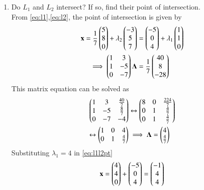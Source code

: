 \documentclass[journal,12pt,twocolumn]{IEEEtran}
\renewcommand\thesection{\arabic{section}}
\begin{document}
\begin{enumerate}[label=\thesection.\arabic*
,ref=\thesection.\theenumi]
\begin{align}
\label{eq:l2}
\end{align}
\item Do $L_1$ and $L_2$ intersect? If so, find their point of intersection.
\\
\solution From \eqref{eq:l1},\eqref{eq:l2}, the point of intersection is given by
\begin{align}
\label{eq:l1l2pt}
\mathbf{x} = \frac{1}{7}\begin{pmatrix} 5 \\ 8 \\ 0\end{pmatrix} + \lambda_2 \begin{pmatrix} -3 \\ 5 \\ 7\end{pmatrix} &= \begin{pmatrix} 
-5 \\ 0 \\ 4\end{pmatrix} + \lambda_1 \begin{pmatrix} 1 \\ 1 \\ 0\end{pmatrix}
\\
\implies 
\begin{pmatrix}1 &  3 \\ 1 & -5 \\ 0 & -7\end{pmatrix}\mathbf{\Lambda} &= \frac{1}{7}\begin{pmatrix}40 \\ 8 \\ -28\end{pmatrix}
\end{align}
This matrix equation can be solved as
\begin{align}
\begin{pmatrix}1 &  3 & \frac{40}{7}\\ 1 & -5 &\frac{8}{7}\\ 0 & -7 & -4\end{pmatrix} &\leftrightarrow \begin{pmatrix}8 &  0 & 
\frac{224}{7}\\ 0 & 1 &\frac{4}{7}\\ 0 & 1 & \frac{4}{7} \end{pmatrix}
\\
\leftrightarrow \begin{pmatrix}1 &  0 & 
4\\ 0 & 1 &\frac{4}{7} \end{pmatrix} &\implies \mathbf{\Lambda} = \begin{pmatrix}4\\\frac{4}{7}\end{pmatrix}
\end{align}
%
Substituting $\lambda_1 = 4$ in \eqref{eq:l1l2pt}
\begin{align}
\mathbf{x} = \begin{pmatrix}4 \\ 4 \\ 0\end{pmatrix} + \begin{pmatrix}-5 \\ 0 \\ 4\end{pmatrix} = \begin{pmatrix}-1\\ 4\\ 4\end{pmatrix}
\end{align}
\end{enumerate}
\end{document}
